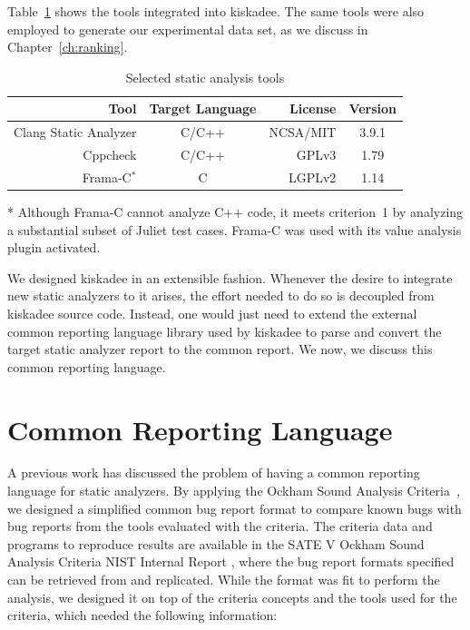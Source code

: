 Table~\ref{tab:selected_tools} shows the tools integrated into kiskadee. The same tools were also employed to generate
our experimental data set, as we discuss in Chapter~\ref{ch:ranking}.

  \begin{table}
    \centering
    \begin{threeparttable}
    \begin{center}
        \begin{tabular}{rcrc}\hline
          Tool & Target Language & License & Version \\
        \hline
          Clang Static Analyzer & C/C++ & NCSA/MIT & 3.9.1\\
          Cppcheck & C/C++ & GPLv3 & 1.79\\
          Frama-C$^{*}$ & C & LGPLv2 & 1.14 \\ \hline
        \end{tabular}
        \begin{tablenotes}
          \small
        \item[*] \footnotesize{Although Frama-C cannot analyze C++ code, it meets criterion~1 by analyzing a substantial subset of Juliet test cases. Frama-C was used with its value analysis plugin activated.}
        \end{tablenotes}
        \caption{Selected static analysis tools}\label{tab:selected_tools}
    \end{center}
    \end{threeparttable}
\end{table}

We designed kiskadee in an extensible fashion. Whenever the desire to
integrate new static analyzers to it arises, the effort needed to do so is
decoupled from kiskadee source code. Instead, one would just need to extend the
external common reporting language library used by kiskadee to parse and
convert the target static analyzer report to the common report. We now, we
discuss this common reporting language.

\section{Common Reporting Language}
\label{sec:firehose}

A previous work has discussed the problem of having a common reporting language
for static analyzers. By applying the Ockham Sound Analysis
Criteria~\citep{black_sate_2016}, we designed a simplified common bug report
format to compare known bugs with bug reports from the tools evaluated with the
criteria. The criteria data and programs to reproduce results are available in
the SATE V Ockham Sound Analysis Criteria NIST Internal Report
\citep{black_sate_2016}, where the bug report formats specified can be retrieved
from and replicated. While the format was fit to perform the analysis, we
designed it on top of the criteria concepts and the tools used for the criteria,
which needed the following information:

